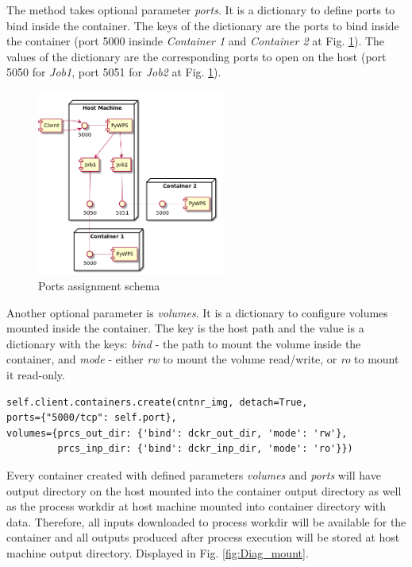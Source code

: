 \documentclass[12pt,a4paper]{article}
\begin{document}
The method takes optional parameter \textit{ports}. It is a dictionary to define ports to bind inside the container. The keys of the
dictionary are the ports to bind inside the container (port 5000 insinde \textit{Container 1} and \textit{Container 2} at Fig. \ref{fig:Diag_port}). The values of the dictionary are the corresponding ports to open on the host (port 5050 for \textit{Job1}, port 5051 for \textit{Job2} at Fig. \ref{fig:Diag_port}).

\begin{figure}[h!]
\centering
\includegraphics[width=0.55\textwidth]{img/Diag_ports.png}
\caption{Ports assignment schema}
\label{fig:Diag_port}
\end{figure}

Another optional parameter is \textit{volumes}. It is a dictionary 
to configure volumes mounted inside the container. The key is the host path and the value is a dictionary with the keys: \textit{bind}
- the path to mount the volume inside the container, and \textit{mode} - either \textit{rw} to mount the volume read/write, or 
\textit{ro} to mount it read-only.

\bigskip
\begin{lstlisting}[basicstyle=\small,caption={\textit{create()} method}]
self.client.containers.create(cntnr_img, detach=True,
ports={"5000/tcp": self.port}, 
volumes={prcs_out_dir: {'bind': dckr_out_dir, 'mode': 'rw'},
         prcs_inp_dir: {'bind': dckr_inp_dir, 'mode': 'ro'}})
\end{lstlisting}

Every container created with defined parameters \textit{volumes} and \textit{ports} will have output directory on the host mounted into 
the container output directory as well as the process workdir at host machine mounted into container directory with data. Therefore, all
inputs downloaded to process workdir will be available for the container and all outputs produced after process execution will be stored
at host machine output directory. Displayed in Fig. \ref{fig:Diag_mount}.
\end{document}
